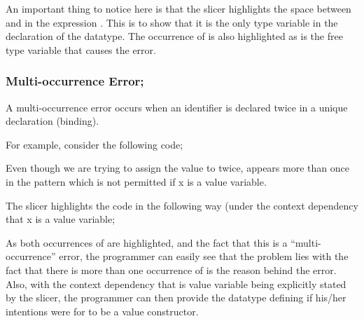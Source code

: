 \documentclass{report}
\begin{document}
\begin{itemize}
An important thing to notice here is that the slicer highlights the
space between  and  in the
expression . This is to show that
it is the only type variable in the declaration of the datatype. The
occurrence of  is also highlighted as
 is the free
type variable that causes the error.



\vspace{1in}


\subsubsection{Multi-occurrence Error;}

\subitem A multi-occurrence error occurs when an identifier is
declared twice in a unique declaration (binding).

For example, consider the following code;


Even though we are trying to assign the value  to
 twice,  appears more than once in
the pattern  which is not permitted if x is
a value variable.

The slicer highlights the code in the following way (under the
context dependency that x is a value variable;


As both occurrences of  are highlighted, and the fact
that this is a ``multi-occurrence'' error, the programmer can easily
see that the problem lies with the fact that there is more than one
occurrence of  is the reason behind the error. Also,
with the context dependency that  is value variable being
explicitly stated by the slicer, the programmer can then provide the
datatype defining  if his/her intentions were for
 to be a value constructor.

\newpage



\end{itemize}
\end{document}
